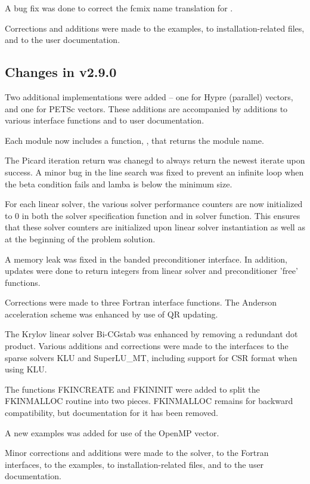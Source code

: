 A bug fix was done to correct the fcmix name translation for .
 
Corrections and additions were made to the examples, 
to installation-related files,
and to the user documentation.

\subsection*{Changes in v2.9.0}

Two additional {\nvector} implementations were added -- one for
Hypre (parallel) vectors, and one for PETSc vectors.  These
additions are accompanied by additions to various interface functions
and to user documentation.

Each {\nvector} module now includes a function, ,
that returns the {\nvector} module name.

The Picard iteration return was chanegd to always return the newest 
iterate upon success.  A minor bug in the line search was fixed
to prevent an infinite loop when the beta condition fails and lamba 
is below the minimum size.

For each linear solver, the various solver performance counters are
now initialized to 0 in both the solver specification function and in
solver  function.  This ensures that these solver counters
are initialized upon linear solver instantiation as well as at the
beginning of the problem solution.

A memory leak was fixed in the banded preconditioner interface.
In addition, updates were done to return integers from linear solver 
and preconditioner 'free' functions.

Corrections were made to three Fortran interface
functions.  The Anderson acceleration scheme was enhanced by use of
QR updating.

The Krylov linear solver Bi-CGstab was enhanced by removing a redundant
dot product.  Various additions and corrections were made to the
interfaces to the sparse solvers KLU and SuperLU\_MT, including support
for CSR format when using KLU.

The functions FKINCREATE and FKININIT were added to split the FKINMALLOC 
routine into two pieces.  FKINMALLOC remains for backward compatibility, but
documentation for it has been removed.

A new examples was added for use of the OpenMP vector.

Minor corrections and additions were made to the {\kinsol} solver, to the
Fortran interfaces, to the examples, to installation-related files,
and to the user documentation.

